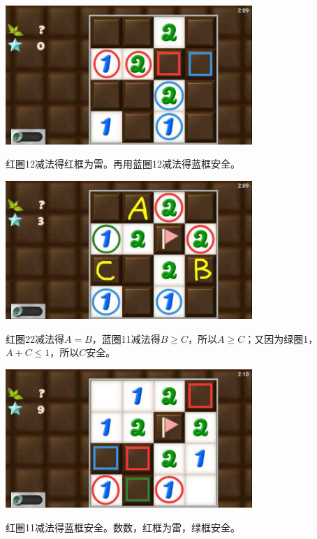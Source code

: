 \subsection{} %
\begin{center}
    \includegraphics[width=0.7\textwidth]{puzzlelow/141-1.jpg}
\end{center}
红圈12减法得红框为雷。再用蓝圈12减法得蓝框安全。
\begin{center}
    \includegraphics[width=0.7\textwidth]{puzzlelow/141-2.jpg}
\end{center}
红圈22减法得$A=B$，蓝圈11减法得$B\ge C$，所以$A\ge C$；又因为绿圈1，$A+C\le 1$，所以$C$安全。
\begin{center}
    \includegraphics[width=0.7\textwidth]{puzzlelow/141-3.jpg}
\end{center}
红圈11减法得蓝框安全。数数，红框为雷，绿框安全。

